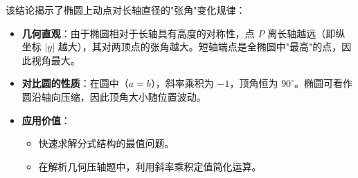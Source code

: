 \begin{explanationbox}
该结论揭示了椭圆上动点对长轴直径的"张角"变化规律：
\begin{itemize}
    \item \textbf{几何直观}：由于椭圆相对于长轴具有高度的对称性，点 $P$ 离长轴越远（即纵坐标 $|y|$ 越大），其对两顶点的张角越大。短轴端点是全椭圆中"最高"的点，因此视角最大。
    \item \textbf{对比圆的性质}：在圆中（$a=b$），斜率乘积为 $-1$，顶角恒为 $90^\circ$。椭圆可看作圆沿轴向压缩，因此顶角大小随位置波动。
    \item \textbf{应用价值}：
    \begin{itemize}
        \item 快速求解分式结构的最值问题。
        \item 在解析几何压轴题中，利用斜率乘积定值简化运算。
    \end{itemize}
\end{itemize}
\end{explanationbox}